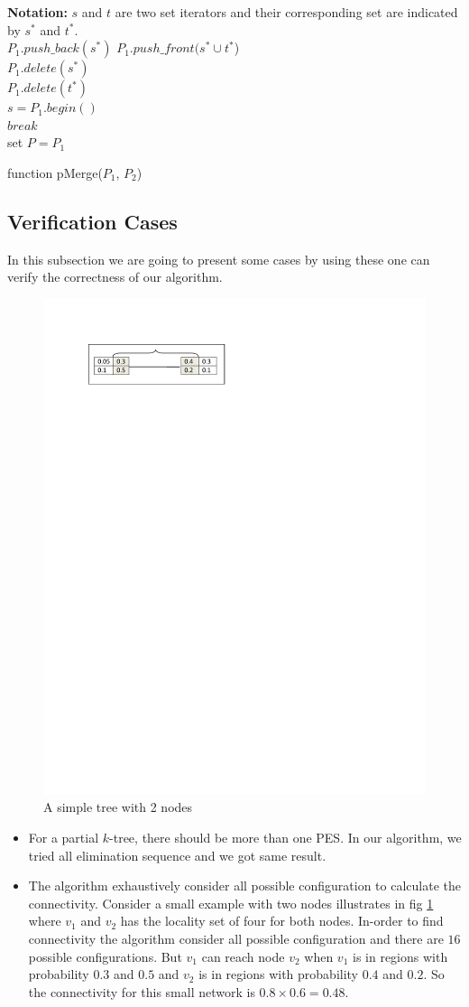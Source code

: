 \documentclass[12pt]{article}
\begin{document}
\begin{algorithm}[H]
\textbf{Notation:} $s$ and $t$ are two set iterators and their corresponding set are indicated by $s^*$ and $t^*$.\\ 
\nl {}
{
\nl $P_1.push\_back(s^*)$
}
\nl {}
{
\nl {}
{
 \nl {}
  {
\nl  	$  P_1.push\_front(s^*\cup t^*$) \\
\nl$P_1.delete(s^*)$\\
  \nl $P_1.delete(t^*)$\\
  \nl $s=P_1.begin()$\\
   \nl$break$\\
  }
}
}
\nl set $P=P_1$\\
\caption{function pMerge($P_1$, $P_2$)}
\end{algorithm}






\subsection{Verification Cases}
\label{subsec:vc}
In this subsection we are going to present some cases by using these one can verify the correctness of our algorithm.
\begin{figure}

\begin{minipage}{.9\linewidth}
\includegraphics[width=3 in, height=.6 in]{verification.pdf}
\caption{A simple tree with 2 nodes}
\end{minipage}
\label{fig:var}
\end{figure}
\begin{itemize}
\item For a partial $k$-tree, there should be more than one PES. In our algorithm, we tried all elimination sequence and we got same result.
\item The algorithm exhaustively consider all possible configuration to calculate the connectivity. Consider a small example with two nodes illustrates in fig \ref{fig:var} where $v_1$ and $v_2$ has the locality set of four for both nodes. In-order to find connectivity the algorithm consider all possible configuration and there are $16$ possible configurations. But $v_1$ can reach node $v_2$ when $v_1$ is in regions with probability $0.3$ and $0.5$ and $v_2$ is in regions with probability $0.4$ and $0.2$. So the connectivity for this small network is $0.8 \times 0.6=0.48$.

\end{itemize}
\end{document}
